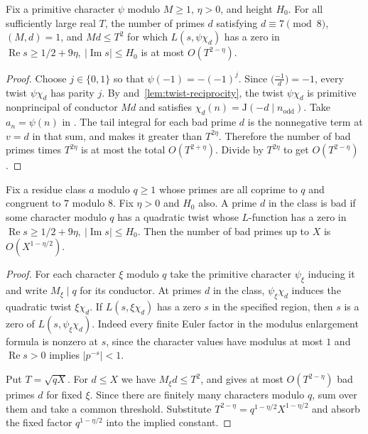 \begin{lemma}
\label{lem:primitive-twist-count}
\emitthmsource
Fix a primitive character $\psi$ modulo $M\ge1$, $\eta>0$, and height $H_0$. For all sufficiently large real $T$, the number of primes $d$ satisfying $d\equiv7\pmod8$, $(M,d)=1$, and $Md\le T^2$ for which $L(s,\psi\chi_d)$ has a zero in $\operatorname{Re}s\ge1/2+9\eta,\ |\operatorname{Im}s|\le H_0$ is at most $O(T^{2-\eta})$.
\end{lemma}
\begin{proof}
Choose $j\in\{0,1\}$ so that $\psi(-1)=-(-1)^j$. Since $\bigl(\frac{-1}{d}\bigr)=-1$, every twist $\psi\chi_d$ has parity $j$. By  and~\ref{lem:twist-reciprocity}, the twist $\psi\chi_d$ is primitive nonprincipal of conductor $Md$ and satisfies $\chi_d(n)=\mathrm J(-d\mid n_{\mathrm{odd}})$.
Take $a_n=\psi(n)$ in . The tail integral for each bad prime $d$ is the nonnegative term at $v=d$ in that sum, and  makes it greater than $T^{2\eta}$. Therefore the number of bad primes times $T^{2\eta}$ is at most the total $O(T^{2+\eta})$. Divide by $T^{2\eta}$ to get $O(T^{2-\eta})$.
\end{proof}

\begin{lemma}
\label{lem:twist-density}
\emitthmsource
Fix a residue class $a$ modulo $q\ge1$ whose primes are all coprime to $q$ and congruent to $7$ modulo $8$. Fix $\eta>0$ and $H_0$ also. A prime $d$ in the class is bad if some character modulo $q$ has a quadratic twist whose $L$-function has a zero in $\operatorname{Re}s\ge1/2+9\eta,\ |\operatorname{Im}s|\le H_0$. Then the number of bad primes up to $X$ is $O(X^{1-\eta/2})$.
\end{lemma}
\begin{proof}
For each character $\xi$ modulo $q$ take the primitive character $\psi_\xi$ inducing it and write $M_\xi\mid q$ for its conductor. At primes $d$ in the class, $\psi_\xi\chi_d$ induces the quadratic twist $\xi\chi_d$. If $L(s,\xi\chi_d)$ has a zero $s$ in the specified region, then $s$ is a zero of $L(s,\psi_\xi\chi_d)$. Indeed every finite Euler factor in the modulus enlargement formula is nonzero at $s$, since the character values have modulus at most $1$ and $\operatorname{Re}s>0$ implies $|p^{-s}|<1$.

Put $T=\sqrt{qX}$. For $d\le X$ we have $M_\xi d\le T^2$, and  gives at most $O(T^{2-\eta})$ bad primes $d$ for fixed $\xi$. Since there are finitely many characters modulo $q$, sum over them and take a common threshold. Substitute $T^{2-\eta}=q^{1-\eta/2}X^{1-\eta/2}$ and absorb the fixed factor $q^{1-\eta/2}$ into the implied constant.
\end{proof}

